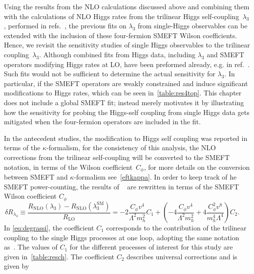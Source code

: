 	\par Using the results from the  NLO calculations discussed above and combining them with the calculations of NLO Higgs rates from the trilinear Higgs self-coupling~$\lambda_3$, performed in refs.~\cite{Gorbahn:2016uoy, Degrassi:2016wml, Bizon:2016wgr, Maltoni:2017ims, Degrassi:2021uik}, the previous fits on $\lambda_3$ from single-Higgs observables can be extended with the inclusion of these four-fermion SMEFT Wilson coefficients. Hence, we revisit the sensitivity studies of single Higgs observables to the trilinear coupling~$\lambda_3$.  
	Although combined fits from Higgs data, including $\lambda_3$ and SMEFT operators modifying Higgs rates at LO, have been preformed already, e.g. in ref.~\cite{DiVita:2017eyz}. Such fits would not be sufficient to determine the actual sensitivity for $\lambda_3$. In particular, if the SMEFT operators are weakly constrained and induce significant modifications to Higgs rates, which can be seen in~\autoref{table:res4top}. This chapter does not include a global SMEFT fit; instead merely motivates it by illustrating how the sensitivity for probing the Higgs-self coupling from single Higgs data gets mitigated when the four-fermion operators are included in the fit.
	\par In the antecedent studies, the modification to Higgs self coupling was reported in terms of the $\kappa$-formalism, for the consistency of this analysis, the NLO corrections from the trilinear self-coupling will be converted to the SMEFT notation, in terms of the Wilson coefficient~$C_\phi$, for more details on the conversion between SMEFT and $\kappa$-formalism see~\autoref{eftkappa}. In order to keep track of he SMEFT power-counting, the results of ~\cite{Degrassi:2016wml} are rewritten in terms of the SMEFT Wilson coefficient $C_\phi$
	\begin{equation}
		\delta R_{\lambda_3}\equiv\frac{R_\mathrm{ NLO}(\lambda_3)-R_\mathrm{ NLO}(\lambda_3^\mathrm{{SM}})}{R_\mathrm{ LO}}=-2\frac{C_{\phi}v^4}{\Lambda^2 m_h^2}C_1 + \left(-4\frac{C_{\phi}v^4}{\Lambda^2 m_h^2}+4\frac{C_{\phi}^2 v^8}{m_h^4\Lambda^4}\right) C_2 . \;\;\;\;\;
		\label{eq:degrassi}
	\end{equation}
	In \eqref{eq:degrassi}, the coefficient $C_1$ corresponds to the contribution of the trilinear coupling to the single Higgs processes at one loop, adopting the same notation as~\cite{Degrassi:2016wml}. The values of $C_1$ for the different processes of interest for this study are given in~\autoref{table:resch}. The coefficient $C_2$ describes universal corrections and is given by
